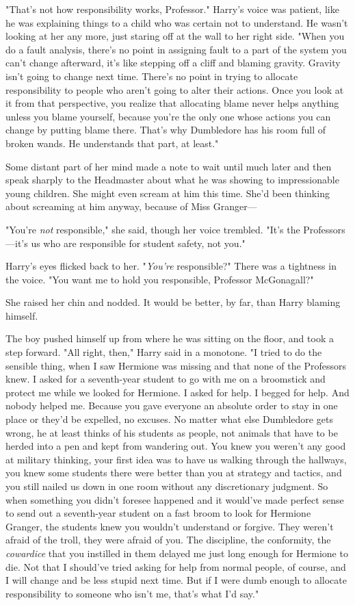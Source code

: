 "That's not how responsibility works, Professor." Harry's voice was patient,
like he was explaining things to a child who was certain not to understand. He
wasn't looking at her any more, just staring off at the wall to her right side.
"When you do a fault analysis, there's no point in assigning fault to a part of
the system you can't change afterward, it's like stepping off a cliff and
blaming gravity. Gravity isn't going to change next time. There's no point in
trying to allocate responsibility to people who aren't going to alter their
actions. Once you look at it from that perspective, you realize that allocating
blame never helps anything unless you blame yourself, because you're the only
one whose actions you can change by putting blame there. That's why Dumbledore
has his room full of broken wands. He understands that part, at least."

Some distant part of her mind made a note to wait until much later and then
speak sharply to the Headmaster about what he was showing to impressionable
young children. She might even scream at him this time. She'd been thinking
about screaming at him anyway, because of Miss Granger---

"You're \emph{not} responsible," she said, though her voice trembled. "It's the
Professors---it's us who are responsible for student safety, not you."

Harry's eyes flicked back to her. "\emph{You're} responsible?" There was a
tightness in the voice. "You want me to hold you responsible, Professor
McGonagall?"

She raised her chin and nodded. It would be better, by far, than Harry blaming
himself.

The boy pushed himself up from where he was sitting on the floor, and took a
step forward. "All right, then," Harry said in a monotone. "I tried to do the
sensible thing, when I saw Hermione was missing and that none of the Professors
knew. I asked for a seventh-year student to go with me on a broomstick and
protect me while we looked for Hermione. I asked for help. I begged for help.
And nobody helped me. Because you gave everyone an absolute order to stay in
one place or they'd be expelled, no excuses. No matter what else Dumbledore
gets wrong, he at least thinks of his students as people, not animals that have
to be herded into a pen and kept from wandering out. You knew you weren't any
good at military thinking, your first idea was to have us walking through the
hallways, you knew some students there were better than you at strategy and
tactics, and you still nailed us down in one room without any discretionary
judgment. So when something you didn't foresee happened and it would've made
perfect sense to send out a seventh-year student on a fast broom to look for
Hermione Granger, the students knew you wouldn't understand or forgive. They
weren't afraid of the troll, they were afraid of you. The discipline, the
conformity, the \emph{cowardice} that you instilled in them delayed me just
long enough for Hermione to die. Not that I should've tried asking for help
from normal people, of course, and I will change and be less stupid next time.
But if I were dumb enough to allocate responsibility to someone who isn't me,
that's what I'd say."

